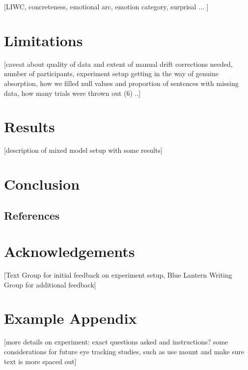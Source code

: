 \documentclass[11pt]{article}
\begin{document}
[LIWC, concreteness, emotional arc, emotion category, surprisal ... ]

\section{Limitations}

[caveat about quality of data and extent of manual drift corrections needed, number of participants, experiment setup getting in the way of genuine absorption, how we filled null values and proportion of sentences with missing data, how many trials were thrown out (6) ..]

\section{Results}

[description of mixed model setup with some results]

\section{Conclusion}


\subsection{References}

\nocite{Green2004,liwc_22,kuzmicova2014,brysbaert2014,chung-fat-yim_cilento_piotrowska_mar_2019,Maslej2019TheTF,boyd_blackburn_pennebaker_2020,green_brock_kaufman_2006,kasunic_kaufman_2018,Consoli2018,busselle2009,jacobs2018,jacobs2017,stockwell2002cognitive,HSU201596,willems_2015,mak2019,kunze2015,ferreira-goncalo-oliveira-2018-seeking,rashkin-etal-2016-connotation,aryani2013,delatorre2019,andrade2020,indico2015}





\section*{Acknowledgements}

[Text Group for initial feedback on experiment setup, Blue Lantern Writing Group for additional feedback]

\appendix

\section{Example Appendix}
\label{sec:appendix}

[more details on experiment: exact questions asked and instructions? some considerations for future eye tracking studies, such as use mount and make sure text is more spaced out]
\end{document}
